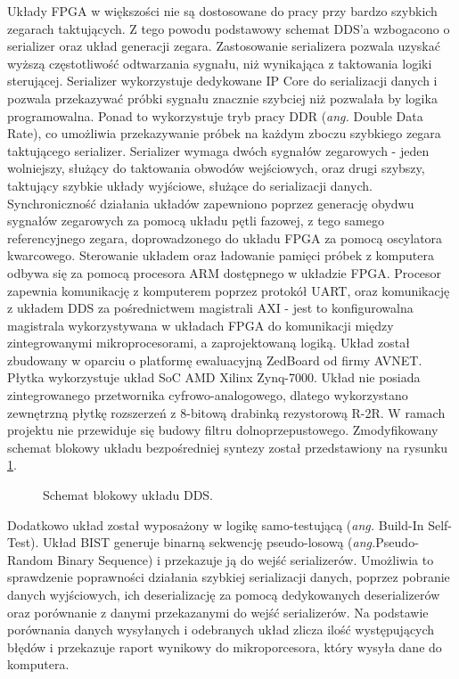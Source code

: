         Układy FPGA w większości nie są dostosowane do pracy przy bardzo szybkich zegarach taktujących. Z tego powodu 
        podstawowy schemat DDS'a wzbogacono o serializer oraz układ generacji zegara. Zastosowanie serializera pozwala 
        uzyskać wyższą częstotliwość odtwarzania sygnału, niż wynikająca z taktowania logiki sterującej. Serializer 
        wykorzystuje dedykowane IP Core do serializacji danych i pozwala przekazywać próbki sygnału znacznie szybciej niż 
        pozwalała by logika programowalna. Ponad to wykorzystuje tryb pracy DDR (\textit{ang.} Double Data Rate), co umożliwia 
        przekazywanie próbek na każdym zboczu szybkiego zegara taktującego serializer. 
        Serializer wymaga dwóch sygnałów zegarowych - jeden wolniejszy, służący do taktowania obwodów wejściowych, oraz drugi szybszy, 
        taktujący szybkie układy wyjściowe, służące do serializacji danych. Synchroniczność działania układów zapewniono poprzez generację 
        obydwu sygnałów zegarowych za pomocą układu pętli fazowej, z tego samego referencyjnego zegara, doprowadzonego do układu 
        FPGA za pomocą oscylatora kwarcowego. Sterowanie układem oraz ładowanie pamięci próbek z komputera odbywa się 
        za pomocą procesora ARM dostępnego w układzie FPGA. Procesor zapewnia komunikację z komputerem poprzez protokół UART, 
        oraz komunikację z układem DDS za pośrednictwem magistrali AXI - jest to konfigurowalna magistrala wykorzystywana w układach 
        FPGA do komunikacji między zintegrowanymi mikroprocesorami, a zaprojektowaną logiką. Układ został zbudowany w oparciu o 
        platformę ewaluacyjną ZedBoard od firmy AVNET. Płytka wykorzystuje układ SoC AMD Xilinx Zynq-7000. Układ nie posiada 
        zintegrowanego przetwornika cyfrowo-analogowego, dlatego wykorzystano zewnętrzną płytkę rozszerzeń z 8-bitową drabinką 
        rezystorową R-2R. W ramach projektu nie przewiduje się budowy filtru dolnoprzepustowego. 
        Zmodyfikowany schemat blokowy układu bezpośredniej syntezy został przedstawiony na rysunku \ref{sch:DDS}.
        \begin{figure}[!ht]
            \centering
            \scalebox{0.95}{}
            \caption{Schemat blokowy układu DDS.}
            \label{sch:DDS}
        \end{figure}

        Dodatkowo układ został wyposażony w logikę samo-testującą (\textit{ang.} Build-In Self-Test). Układ BIST generuje binarną 
        sekwencję pseudo-losową (\textit{ang.}Pseudo-Random Binary Sequence) i przekazuje ją do wejść serializerów. Umożliwia to 
        sprawdzenie poprawności działania szybkiej serializacji danych, poprzez pobranie danych wyjściowych, ich deserializację za 
        pomocą dedykowanych deserializerów oraz porównanie z danymi przekazanymi do wejść serializerów. Na podstawie porównania danych 
        wysyłanych i odebranych układ zlicza ilość występujących błędów i przekazuje raport wynikowy do mikroporcesora, który wysyła 
        dane do komputera. 

